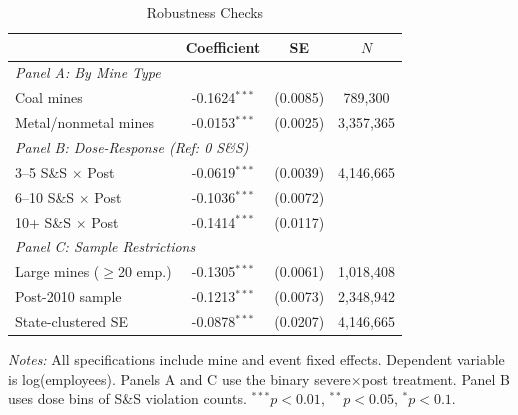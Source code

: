 \begin{table}[htbp]
\centering
\caption{Robustness Checks}
\label{tab:robustness}
\begin{tabular}{lccc}
\toprule
 & Coefficient & SE & $N$ \\
\midrule
\multicolumn{4}{l}{\textit{Panel A: By Mine Type}} \\
Coal mines & -0.1624$^{***}$ & (0.0085) & 789,300 \\
Metal/nonmetal mines & -0.0153$^{***}$ & (0.0025) & 3,357,365 \\
\midrule
\multicolumn{4}{l}{\textit{Panel B: Dose-Response (Ref: 0 S\&S)}} \\
3--5 S\&S $\times$ Post & -0.0619$^{***}$ & (0.0039) & 4,146,665 \\
6--10 S\&S $\times$ Post & -0.1036$^{***}$ & (0.0072) & \\
10+ S\&S $\times$ Post & -0.1414$^{***}$ & (0.0117) & \\
\midrule
\multicolumn{4}{l}{\textit{Panel C: Sample Restrictions}} \\
Large mines ($\geq$20 emp.) & -0.1305$^{***}$ & (0.0061) & 1,018,408 \\
Post-2010 sample & -0.1213$^{***}$ & (0.0073) & 2,348,942 \\
State-clustered SE & -0.0878$^{***}$ & (0.0207) & 4,146,665 \\
\bottomrule
\end{tabular}
\begin{tablenotes}[flushleft]\small
\item \textit{Notes:} All specifications include mine and event fixed effects. Dependent variable is log(employees). Panels A and C use the binary severe$\times$post treatment. Panel B uses dose bins of S\&S violation counts. $^{***}p<0.01$, $^{**}p<0.05$, $^{*}p<0.1$.
\end{tablenotes}
\end{table}

